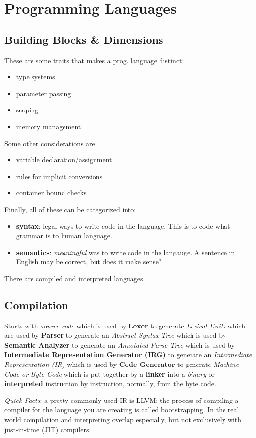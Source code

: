 \section{Programming Languages}
\subsection*{Building Blocks \& Dimensions}
These are some traits that makes a prog. language distinct:
\begin{itemize}
  \item type systems
  \item parameter passing
  \item scoping
  \item memory management
\end{itemize}
Some other considerations are
\begin{itemize}
  \item variable declaration/assignment
  \item rules for implicit conversions
  \item container bound checks
\end{itemize}
Finally, all of these can be categorized into:
\begin{itemize}
  \item \textbf{syntax}: legal ways to write code in the language. This
  is to code what grammar is to human language.
  \item \textbf{semantics}: \textit{meaningful} was to write code in the
  langauge. A sentence in English may be correct, but does it make
  sense?
\end{itemize}

There are compiled and interpreted languages.

\subsection*{Compilation}
Starts with \textit{source code} which is used by \textbf{Lexer} to
generate \textit{Lexical Units} which are used by \textbf{Parser} to
generate an \textit{Abstract Syntax Tree} which is used by
\textbf{Semantic Analyzer} to generate an \textit{Annotated Parse Tree}
which is used by \textbf{Intermediate Representation Generator (IRG)} to
generate an \textit{Intermediate Representation (IR)} which is used by
\textbf{Code Generator} to generate \textit{Machine Code or Byte Code}
which is put together by a \textbf{linker} into a \textit{binary} or
\textbf{interpreted} instruction by instruction, normally, from the byte
code.

\textit{Quick Facts}: a pretty commonly used IR is LLVM; the process of
compiling a compiler for the language you are creating is called
bootstrapping. In the real world compilation and interpreting overlap
especially, but not exclusively with just-in-time (JIT) compilers.